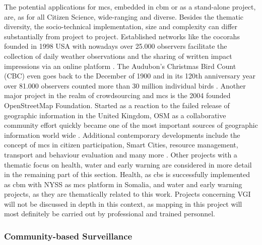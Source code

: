 The potential applications for \acrshort{mcs}, embedded in \acrshort{cbm} or as a stand-alone project, are, as for all Citizen Science, wide-ranging and diverse. Besides the thematic diversity, the socio-technical implementation, size and complexity can differ substantially from project to project. Established networks like the \acrfull{cocorahs} founded in 1998 USA with nowadays over 25.000 observers facilitate the collection of daily weather observations and the sharing of written impact impressions via an online platform \autocite{cocorahsCoCoRaHSCommunityCollaborative2023,lackstromBackyardHydroclimatologyCitizen2022}. The Audubon's Christmas Bird Count (CBC) even goes back to the December of 1900 and in its 120th anniversary year over 81.000 observers counted more than 30 million individual birds \autocite{lebaron122ndChristmasBird2022}. Another major project in the realm of crowdsourcing and \acrshort{mcs} is the 2004 founded OpenStreetMap Foundation. Started as a reaction to the failed release of geographic information in the United Kingdom, OSM as a collaborative community effort quickly became one of the most important sources of geographic information world wide \autocite{bennettOpenStreetMap2010, openstreetmapcontributorsOpenStreetMapBasemap2020}. Additional contemporary developments include the concept of \acrshort{mcs} in citizen participation, Smart Cities, resource management, transport and behaviour evaluation and many more \autocite{dipasDIPASOrgDIPAS2023,europeancommissionCitizencentredApproachSmart2021, wangSurveyApplicationKey2022}. 
Other projects with a thematic focus on health, water and early warning are considered in more detail in the remaining part of this section. Health, as \acrfull{cbs} is successfully implemented as \acrshort{cbm} with NYSS as \acrshort{mcs} platform in Somalia, and water and early warning projects, as they are thematically related to this work. Projects concerning VGI will not be discussed in depth in this context, as mapping in this project will most definitely be carried out by professional and trained personnel.

\subsubsection*{Community-based Surveillance}\label{subsubsec:cbs}

